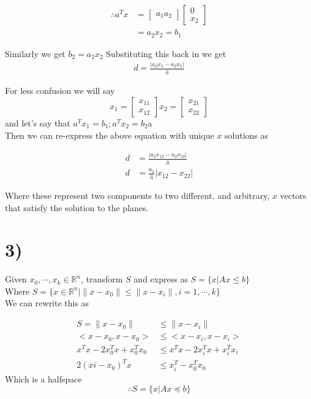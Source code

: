 \documentclass[12pt,letter]{article}
\begin{document}
\begin{align*}
    \therefore a^Tx &= \begin{bmatrix}a_1 a_2\end{bmatrix}\begin{bmatrix}0\\x_2\end{bmatrix} \\
                    &= a_2x_2 =b_1
\end{align*}

Similarly we get $b_2 = a_2x_2$
Substituting this back in we get
\begin{align*}
    d = \frac{|a_2x_2 - a_2x_2|}{\hat a}
\end{align*}

For less confusion we will say
\[
    x_1 = \begin{bmatrix}x_{11}\\x_{12}\end{bmatrix}
    x_2 = \begin{bmatrix}x_{21}\\x_{22}\end{bmatrix}
\]
and let's say that $a^Tx_1 = b_1; a^Tx_2 = b_2$a\\
Then we can re-express the above equation with unique $x$ solutions as

\begin{align*}
    d &= \frac{|a_2 x_{12} - a_2x_{22}|}{\hat a} \\
    d &= \frac{a_2}{\hat a}|x_{12}-x_{22}|
\end{align*}

Where these represent two components to two different, and arbitrary, $x$ 
vectors that satisfy the solution to the planes.
\section*{3)}
Given $x_0,\cdots,x_k\in\mathbb{R}^n$, transform $S$ and express as $S = \{x|Ax\le b\}$ \\
Where $S = \{x\in\mathbb{R}^n| \|x-x_0\|\le\|x-x_i\|, i=1,\cdots,k\}$ \\ 
We can rewrite this as

\begin{align*}
    S = \|x-x_0\| &\leq \|x-x_i\| \\%
    <x-x_0,x-x_0> &\leq <x-x_i,x-x_i> \\
    x^Tx - 2x_0^Tx + x_0^Tx_0 &\leq x^Tx - 2x_i^Tx + x_i^Tx_i \\
    2(xi-x_0)^Tx &\leq x_i^T - x_0^Tx_0 
\end{align*}
Which is a halfspace
\[
    \therefore S = \{x|Ax\preceq b \}
\]
\end{document}
